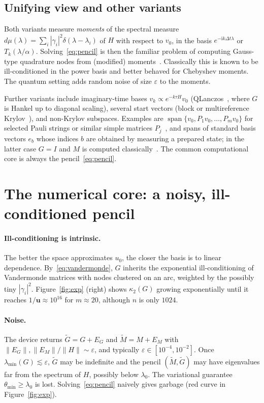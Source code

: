 \documentclass[11pt,a4paper]{article}
\begin{document}
\subsection{Unifying view and other variants}\label{sec:moments}

Both variants measure \emph{moments} of the spectral measure
$d\mu(\lambda)=\sum_i|\gamma_i|^2\delta(\lambda-\lambda_i)$ of $H$ with respect to
$v_0$, in the basis $e^{-\mathrm{i}k\Delta t\lambda}$ or $T_k(\lambda/\alpha)$.
Solving~\eqref{eq:pencil} is then the familiar problem of computing
Gauss-type quadrature nodes from (modified) moments~\cite{GM10}. Classically
this is known to be ill-conditioned in the power basis and better
behaved for Chebyshev moments. The quantum setting adds random noise of
size $\varepsilon$ to the moments.

Further variants include imaginary-time bases
$v_k\propto e^{-k\tau H}v_0$ (QLanczos~\cite{Motta20}, where $G$ is Hankel up to diagonal scaling), several
start vectors (block or multireference Krylov~\cite{SHE20}), and
non-Krylov subspaces. Examples are $\operatorname{span}\{v_0,P_1v_0,\dots,P_mv_0\}$
for selected Pauli strings or similar simple matrices
$P_j$~\cite{McClean17}, and spans of standard basis vectors $e_b$ whose
indices $b$ are obtained by measuring a prepared state; in the latter
case $G=I$ and $M$ is computed classically~\cite{RM25}. The common computational core is always the
pencil~\eqref{eq:pencil}.

\section{The numerical core: a noisy, ill-conditioned pencil}\label{sec:noisy}

\paragraph{Ill-conditioning is intrinsic.} The better the space
approximates $u_0$, the closer the basis is to linear dependence.
By~\eqref{eq:vandermonde}, $G$ inherits the exponential
ill-conditioning of Vandermonde matrices with nodes clustered on an arc,
weighted by the possibly tiny $|\gamma_i|^2$. Figure~\ref{fig:exp}
(right) shows $\kappa_2(G)$ growing exponentially until it reaches
$1/\mathbf{u}\approx 10^{16}$ for $m\approx 20$, although $n$ is only $1024$.

\paragraph{Noise.} The device returns $\widetilde G = G+E_G$ and
$\widetilde M = M + E_M$ with $\|E_G\|,\|E_M\|/\|H\|\sim\varepsilon$, and
typically $\varepsilon\in[10^{-4},10^{-2}]$. Once
$\lambda_{\min}(G)\lesssim\varepsilon$, $\widetilde G$ may be indefinite
and the pencil $(\widetilde M,\widetilde G)$ may have eigenvalues far
from the spectrum of $H$, possibly below $\lambda_0$. The variational
guarantee $\theta_{\min}\ge\lambda_0$ is lost. Solving~\eqref{eq:pencil}
naively gives garbage (red curve in Figure~\ref{fig:exp}).
\end{document}
